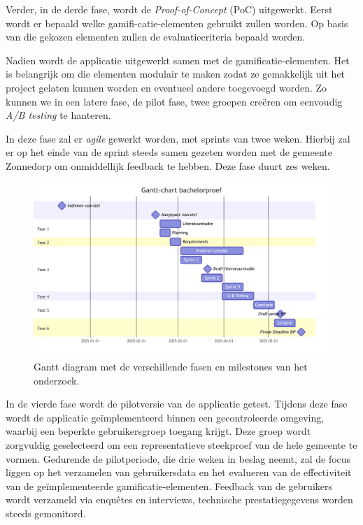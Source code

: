 \documentclass{hogent-article}
\begin{document}
Verder, in de derde fase,  wordt de \emph{Proof-of-Concept} (PoC) uitgewerkt. Eerst wordt er bepaald welke gamifi-catie-elementen gebruikt zullen worden. Op basis van die gekozen elementen zullen de evaluatiecriteria bepaald worden.

Nadien wordt de applicatie uitgewerkt samen met de gamificatie-elementen. Het is belangrijk om die elementen modulair te maken zodat ze gemakkelijk uit het project gelaten kunnen worden en eventueel andere toegevoegd worden. Zo kunnen we in een latere fase, de pilot fase, twee groepen creëren om eenvoudig \emph{A/B testing} te hanteren.

In deze fase zal er \emph{agile} gewerkt worden, met sprints van twee weken. Hierbij zal er op het einde van de sprint steeds samen gezeten worden met de gemeente Zonnedorp om onmiddellijk feedback te hebben. Deze fase duurt zes weken. 

\begin{figure}
    \centering
    \includegraphics[width=\textwidth]{chart.png}
    \caption{\label{fig:gantt}Gantt diagram met de verschillende fasen en milestones van het onderzoek.}
\end{figure}

In de vierde fase wordt de pilotversie van de applicatie getest. Tijdens deze fase wordt de applicatie geïmplementeerd binnen een gecontroleerde omgeving, waarbij een beperkte gebruikersgroep toegang krijgt. Deze groep wordt zorgvuldig geselecteerd om een representatieve steekproef van de hele gemeente te vormen. Gedurende de pilotperiode, die drie weken in beslag neemt, zal de focus liggen op het verzamelen van gebruikersdata en het evalueren van de effectiviteit van de geïmplementeerde gamificatie-elementen. Feedback van de gebruikers wordt verzameld via enquêtes en interviews, technische prestatiegegevens worden steeds gemonitord. 
\end{document}
